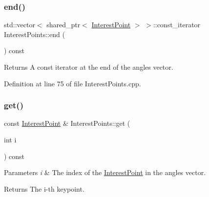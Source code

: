 \mbox{\label{classdefals_1_1_interest_points_affb368f5b8de93ba1b369ec9caa4222e}} 
\subsubsection{\texorpdfstring{end()}{end()}\hspace{0.1cm}{\footnotesize\ttfamily [2/2]}}
{\footnotesize\ttfamily std\+::vector$<$ shared\+\_\+ptr$<$ \hyperlink{classdefals_1_1_interest_point}{Interest\+Point} $>$ $>$\+::const\+\_\+iterator Interest\+Points\+::end (\begin{DoxyParamCaption}{ }\end{DoxyParamCaption}) const}

\begin{DoxyReturn}{Returns}
A const iterator at the end of the angles vector. 
\end{DoxyReturn}


Definition at line 75 of file Interest\+Points.\+cpp.

\mbox{\label{classdefals_1_1_interest_points_a49503e93237f48b81717de04a950c685}} 
\subsubsection{\texorpdfstring{get()}{get()}}
{\footnotesize\ttfamily const \hyperlink{classdefals_1_1_interest_point}{Interest\+Point} \& Interest\+Points\+::get (\begin{DoxyParamCaption}\item[{int}]{i }\end{DoxyParamCaption}) const}


\begin{DoxyParams}{Parameters}
{\em i} & The index of the \hyperlink{classdefals_1_1_interest_point}{Interest\+Point} in the angles vector.\\
\hline
\end{DoxyParams}
\begin{DoxyReturn}{Returns}
The i-\/th keypoint. 
\end{DoxyReturn}


